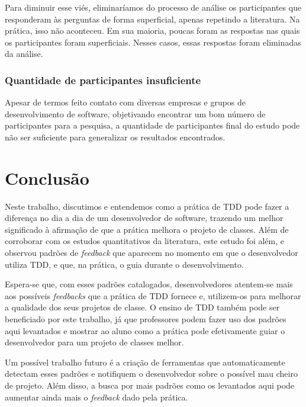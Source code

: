 \documentclass[conference]{IEEEtran}
\begin{document}
Para diminuir esse viés, eliminaríamos do processo de análise os participantes
que responderam às perguntas de forma superficial, apenas repetindo a literatura. Na prática,
isso não aconteceu. Em sua maioria, poucas foram as respostas nas quais os participantes
foram superficiais. Nesses casos, essas respostas foram eliminadas da análise.

\subsubsection{Quantidade de participantes insuficiente}

Apesar de termos feito contato
com diversas empresas e grupos de desenvolvimento de software,
objetivando encontrar um bom número de participantes para a pesquisa,
a quantidade de participantes final do estudo pode não ser suficiente para generalizar
os resultados encontrados. 

\section{Conclusão}

Neste trabalho, discutimos e entendemos como a prática de TDD pode
fazer a diferença no dia a dia de um desenvolvedor de software,
trazendo um melhor significado à afirmação de que a prática melhora o projeto de classes.
Além de corroborar com os estudos quantitativos da literatura, este estudo
foi além, e observou padrões de \textit{feedback} que aparecem
no momento em que o desenvolvedor utiliza TDD, e que, na prática, o guia durante
o desenvolvimento. 

Espera-se que, com esses padrões catalogados, desenvolvedores atentem-se mais
aos possíveis \textit{feedbacks} que a prática de TDD fornece e, utilizem-os
para melhorar a qualidade dos seus projetos de classe. O ensino de TDD também
pode ser beneficiado por este trabalho, já que professores podem fazer uso dos padrões
aqui levantados e mostrar ao aluno como a prática pode efetivamente guiar
o desenvolvedor para um projeto de classes melhor.

Um possível trabalho futuro
é a criação de ferramentas que automaticamente detectam esses padrões e notifiquem
o desenvolvedor sobre o possível mau cheiro de projeto. 
Além disso, a busca por mais padrões como os levantados aqui pode aumentar ainda 
mais o \textit{feedback} dado pela prática. 
\end{document}
